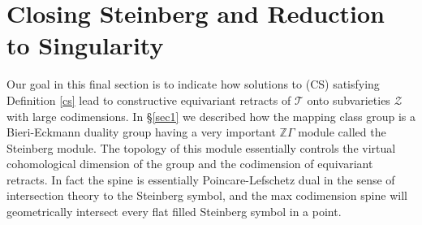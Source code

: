 \documentclass[12pt]{amsart}
\theoremstyle{definition}
\theoremstyle{remark}
\newcommand{\bZ}{\mathbb{Z}}
\newcommand{\uF}{\underline{F}}
\newcommand{\sC}{\mathscr{C}}
\newcommand{\sT}{\mathscr{T}}
\newcommand{\sZ}{\mathscr{Z}}
\begin{document}



















\section{Closing Steinberg and Reduction to Singularity}


Our goal in this final section is to indicate how solutions to (CS) satisfying Definition \ref{cs} lead to constructive equivariant retracts of $\sT$ onto subvarieties $\sZ$ with large codimensions. In \S \ref{sec1} we described how the mapping class group is a Bieri-Eckmann duality group having a very important $\bZ \Gamma$ module called the Steinberg module. The topology of this module essentially controls the virtual cohomological dimension of the group and the codimension of equivariant retracts. In fact the spine is essentially Poincare-Lefschetz dual in the sense of intersection theory to the Steinberg symbol, and the max codimension spine will geometrically intersect every flat filled Steinberg symbol in a point.
\end{document}
